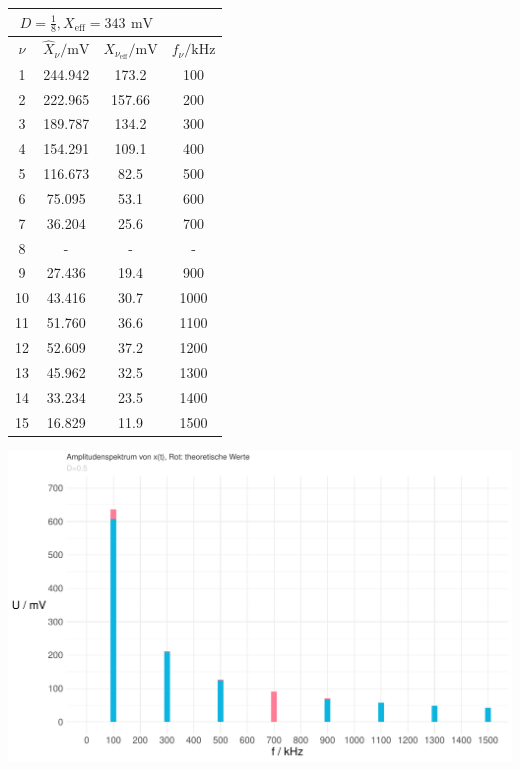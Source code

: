 \documentclass[a4paper, 12pt]{article}
\begin{document}
\begin{center}
        \bgroup
        \def\arraystretch{1.6180339887498948}
          \begin{tabular}{@{}cccc@{}}
          \toprule
          \multicolumn{3}{c}{$D = \frac{1}{8}, X_{\text{eff}} = 343 \,\ \si{\milli\volt}$} \\ \midrule
          $\nu$      & $\hat{X}_\nu / \si{\milli\volt}$   & $X_{\nu_{\text{eff}}} / \si{\milli\volt}$ & $f_\nu / \si{\kilo\hertz}$ \\ \hline
          1  & 244.942     & 173.2      & 100      \\
          2  & 222.965     & 157.66     & 200      \\
          3  & 189.787     & 134.2      & 300      \\
          4  & 154.291     & 109.1      & 400      \\
          5  & 116.673     & 82.5       & 500      \\
          6  & 75.095      & 53.1       & 600      \\
          7  & 36.204      & 25.6       & 700      \\
          8  &  -           & -           & -         \\
          9  & 27.436      & 19.4       & 900      \\
          10 & 43.416      & 30.7       & 1000     \\
          11 & 51.760      & 36.6       & 1100     \\
          12 & 52.609      & 37.2       & 1200     \\
          13 & 45.962      & 32.5       & 1300     \\
          14 & 33.234      & 23.5       & 1400     \\
          15 & 16.829      & 11.9       & 1500     \\ \bottomrule
          \end{tabular}
          \egroup
    \end{center}

    \begin{center}
      \includegraphics[scale=0.5]{./R/3_1/3_1_ASpektrum.pdf}
    \end{center}


  \subsection{}

  \subsection{}
\end{document}
